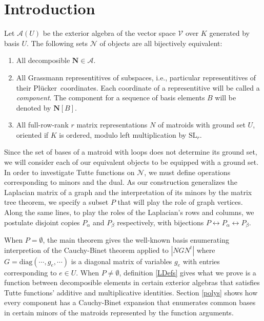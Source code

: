\documentclass[Unicode]{cedram-alco}
\newcommand{\ext}[1]{\ensuremath{\mathbf{#1}}}
\newcommand{\Plucker}{Pl\"{u}cker\ }
\begin{document}
\section{Introduction}
Let $\mathcal{A}(U)$ be the exterior algebra of the vector space
$\mathcal{V}$ over $K$ generated by basis $U$.  The following
sets $\mathcal{N}$ of objects are all bijectively equivalent:
\begin{enumerate}
\item All decomposible $\ext{N}\in\mathcal{A}$.
\item All Grassmann representitives\cite{MarcusFDMuAlPt2} of subspaces,
  i.e., particular representitives of their \Plucker coordinates.
  Each coordinate of a representitive will be called a \emph{component}.
  The component
  for a sequence of basis elements $B$ will be denoted by $\ext{N}[B]$.
\item All full-row-rank $r$
  matrix representations $N$ of matroids with ground set $U$,
  oriented if $K$ is ordered, modulo left multiplication by
  $\text{SL}_r$.   
\end{enumerate}

Since the set of bases of a matroid with loops does not
determine its ground set, we will consider each of our equivalent
objects to be equipped with a ground set.  In order
to investigate Tutte functions on $\mathcal{N}$, we must
define operations corresponding to minors and the dual.
As our construction generalizes the Laplacian matrix of
a graph and the interpretation of its minors by the
matrix tree theorem\cite{sdcMTT},
we specify a subset $P$ that will play the role of graph vertices.
Along the same lines, to play the roles of the Laplacian's
rows and columns, we postulate disjoint copies $P_\alpha$ and
$P_\beta$ respectively, with bijections
$P \leftrightarrow P_{\alpha}\leftrightarrow P_{\beta}$.

When $P=\emptyset$, the main theorem gives the well-known
basis enumerating interpretion of the Cauchy-Binet theorem applied to
$|N G N^t|$
where $G=\text{diag}(\cdots, g_e , \cdots )$ is a diagonal matrix of variables
$g_e$ with entries corresponding to $e\in U$.
When $P\neq\emptyset$, definition \ref{LDefs} gives what we prove
is a function between decomposible elements in certain
exterior algebras that satisfies Tutte functions'
additive and multiplicative identities.  Section \ref{polys} shows how
every component has a Cauchy-Binet expansion that enumerates
common bases in certain minors of the matroids represented by
the function arguments.
\end{document}
